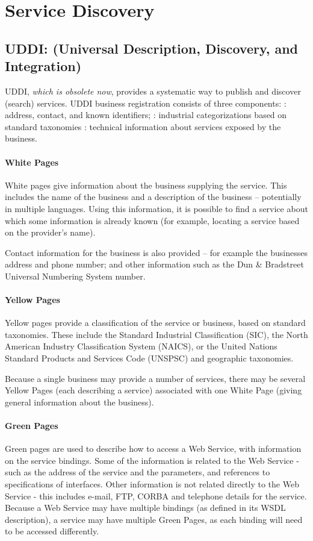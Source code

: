 \documentclass{note}
\begin{document}
\section{Service Discovery}

\subsection{UDDI: (Universal Description, Discovery, and Integration)}
UDDI, \textcolor{red2}{\em which is obsolete now\/}, 
provides a systematic way to publish and discover (search) services.
UDDI business registration consists of three components:
\bit
\w {}: address, contact, and known identifiers;
\w {}: industrial categorizations based on standard taxonomies
\w {}: technical information about services exposed by the
business. 
\eit

\paragraph{White Pages}
White pages give information about the business supplying the service. This
includes the name of the business and a description of the business --
potentially in multiple languages. Using this information, it is possible to
find a service about which some information is already known (for example,
locating a service based on the provider's name). 

Contact information for the business is also provided -- for example the
businesses address and phone number; and other information such as the Dun \&
Bradstreet Universal Numbering System number. 

\paragraph{Yellow Pages}
Yellow pages provide a classification of the service or business, based on
standard taxonomies. These include the Standard Industrial Classification
(SIC), the North American Industry Classification System (NAICS), or the
United Nations Standard Products and Services Code (UNSPSC) and geographic
taxonomies. 

Because a single business may provide a number of services, there may be
several Yellow Pages (each describing a service) associated with one White
Page (giving general information about the business). 

\paragraph{Green Pages}
Green pages are used to describe how to access a Web Service, with information
on the service bindings. Some of the information is related to the Web Service
- such as the address of the service and the parameters, and references to
specifications of interfaces. Other information is not related directly to
the Web Service - this includes e-mail, FTP, CORBA and telephone details for
the service. Because a Web Service may have multiple bindings (as defined in
its WSDL description), a service may have multiple Green Pages, as each
binding will need to be accessed differently. 
\end{document}
